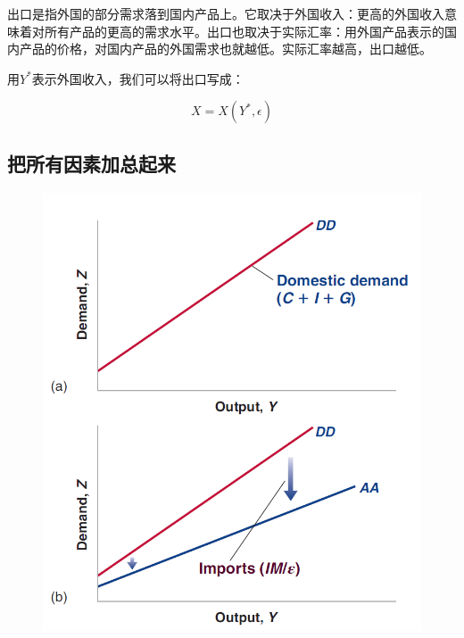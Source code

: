 \documentclass{article}
\begin{document}
出口是指外国的部分需求落到国内产品上。它取决于外国收入：更高的外国收入意味着对所有产品的更高的需求水平。出口也取决于实际汇率：用外国产品表示的国内产品的价格，对国内产品的外国需求也就越低。实际汇率越高，出口越低。

用$ Y^* $表示外国收入，我们可以将出口写成：

\[
X=X(Y^*,\epsilon)
\]

\subsection{把所有因素加总起来}

\begin{figure}[H] %
	\centering %
	\includegraphics[width=1\textwidth]{18_1} %
	\caption{} %
	\label{Fig.main2} %
\end{figure}
\end{document}
